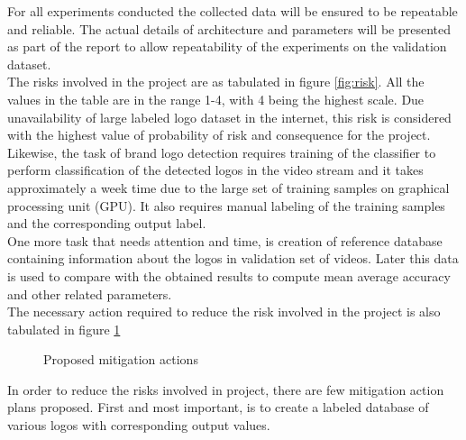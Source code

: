  For all experiments conducted the collected data will be ensured to be repeatable and reliable. The actual details of architecture and parameters will be presented as part of the report to allow repeatability of the experiments on the validation dataset. \\
 The risks involved in the project are as tabulated in figure \ref{fig:risk}. All the values in the table are in the range 1-4, with 4 being the highest scale. Due unavailability of large labeled logo dataset in the internet, this risk is considered with the highest value of probability of risk and consequence for the project. Likewise, the task of brand logo detection requires training of the classifier to perform classification of the detected logos in the video stream and it takes approximately a week time due to the large set of  training samples on graphical processing unit (GPU). It also requires manual labeling of the training samples and the corresponding output label. \\
 One more task that needs attention and time, is creation of reference database containing information about the logos in validation set of videos. Later this data is used to compare with the obtained results to compute mean average accuracy and other related parameters.\\
 The necessary action required to reduce the risk involved in the project is also tabulated in figure \ref{fig:action}
 
 \begin{figure}[htp] 
  \caption{Proposed mitigation actions}\label{fig:action}
 \end{figure}
 
 In order to reduce the risks involved in project, there are few mitigation action plans proposed. First and most important, is to create a labeled database of various logos with corresponding output values. 
 
